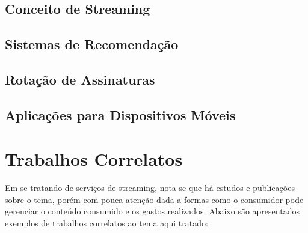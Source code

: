 \documentclass[conference]{IEEEtran}
\begin{document}
\subsection{Conceito de Streaming}

\subsection{Sistemas de Recomendação}

\subsection{Rotação de Assinaturas}

\subsection{Aplicações para Dispositivos Móveis}

\section{Trabalhos Correlatos}

Em se tratando de serviços de streaming, nota-se que há estudos e publicações sobre o tema, porém com pouca atenção dada a formas como o consumidor pode gerenciar o conteúdo consumido e os gastos realizados.
Abaixo são apresentados exemplos de trabalhos correlatos ao tema aqui tratado:
\end{document}
